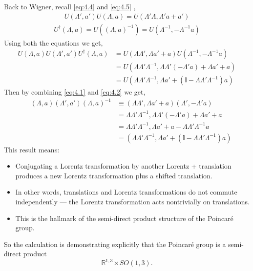\documentclass[14pt]{article} %
\begin{document}
\noindent
Back to Wigner, recall \eqref{eq:4.4} and \eqref{eq:4.5} ,
\begin{align*}
U(\Lambda', a')U(\Lambda, a) = U(\Lambda'\Lambda,\Lambda' a + a') \tag{4.4}
\end{align*}
\begin{align*}
U^\dagger(\Lambda,a)=U\left((\Lambda,a)^{-1}\right)=U(\Lambda^{-1},-\Lambda^{-1}a)  \tag{4.5}
\end{align*}
Using both the equations we get,
\begin{align*}
U(\Lambda, a) U(\Lambda', a') U^\dagger(\Lambda, a)
&= U(\Lambda \Lambda', \Lambda a' + a) U(\Lambda^{-1}, -\Lambda^{-1} a) \\
&= U(\Lambda \Lambda' \Lambda^{-1}, \Lambda \Lambda' (-\Lambda' a) + \Lambda a' + a) \\
&= U(\Lambda \Lambda' \Lambda^{-1}, \Lambda a' + (\mathbb{I} - \Lambda \Lambda' \Lambda^{-1}) a) \tag{4.6} \label{4.6}
\end{align*}
Then by combining \eqref{eq:4.1} and \eqref{eq:4.2} we get,
\begin{align*}
\quad~(\Lambda, a) (\Lambda', a') (\Lambda, a)^{-1} 
&\equiv (\Lambda \Lambda', \Lambda a' + a) (\Lambda', -\Lambda' a) \\
&= \Lambda \Lambda' \Lambda^{-1}, \Lambda \Lambda' (-\Lambda' a) + \Lambda a' + a \\
&= \Lambda \Lambda' \Lambda^{-1}, \Lambda a' +a - \Lambda \Lambda' \Lambda^{-1} a \\
&= \left( \Lambda \Lambda' \Lambda^{-1}, \Lambda a' + (\mathbb{I} - \Lambda \Lambda' \Lambda^{-1}) a \right) \tag{4.7} \label{4.7}
\end{align*}
This result means:
\begin{itemize}
    \item Conjugating a Lorentz transformation by another Lorentz + translation produces a new Lorentz transformation plus a shifted translation.

\item In other words, translations and Lorentz transformations do not commute independently — the Lorentz transformation acts nontrivially on translations.

\item This is the hallmark of the semi-direct product structure of the Poincaré group.
\end{itemize}
So the calculation is demonstrating explicitly that the Poincaré group is a semi-direct product 
\[
\mathbb{R}^{1,3} \rtimes SO(1,3).
\]
\end{document}
